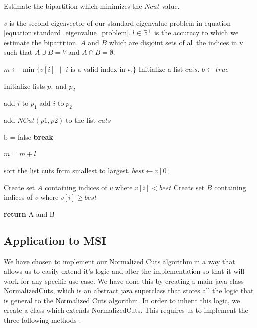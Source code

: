 \documentclass[11pt,openany]{book}
\begin{document}
\begin{algorithm}
    \label{alg:calculate_ncut_bipartition}
    \caption{Estimate the bipartition which minimizes the $Ncut$ value.}
    \begin{algorithmic}
        \Require $v$ is the second eigenvector of our standard eigenvalue problem in equation \ref{equation:standard_eigenvalue_problem}. $l \in \mathbb{R}^{+}$ is the accuracy to which we estimate the bipartition.
        \Ensure $A$ and $B$ which are disjoint sets of all the indices in v such that $A \cup B = V$ and $A \cap B = \emptyset$.
            
        \State $m \gets \min \{v[i] \text{ }| \text{ } i \text{ is a valid index in v.}\}$
        \State Initialize a list $cuts$.
        \State $b \gets true$
            
            
            \State Initialize lists $p_1$ and $p_2$
                    
                    \State add $i$ to $p_1$
                \Else
                    \State add $i$ to $p_2$
                        
                \EndIf
            \EndFor
            
            \State add $NCut(p1,p2)$ to the list $cuts$
            
                \State b = false
                \State \textbf{break}
            \EndIf
            
            \State $m = m + l$
                
        \EndWhile
            
        \State sort the list cuts from smallest to largest.
        \State $best \gets v[0]$
            
        \State Create set $A$ containing indices of $v$ where $v[i] < best$
        \State Create set $B$ containing indices of $v$ where $v[i] \geq best$
            
        \State \textbf{return} A and B
        
        \EndProcedure
    \end{algorithmic}
\end{algorithm}

\subsection{Application to MSI}
We have chosen to implement our Normalized Cuts algorithm in a way that allows us to easily extend it's logic and alter the implementation so that it will work for any specific use case. We have done this by creating a main java class NormalizedCuts, which is an abstract java superclass that stores all the logic that is general to the Normalized Cuts algorithm. In order to inherit this logic, we create a class which extends NormalizedCuts. This requires us to implement the three following methods :
\end{document}

